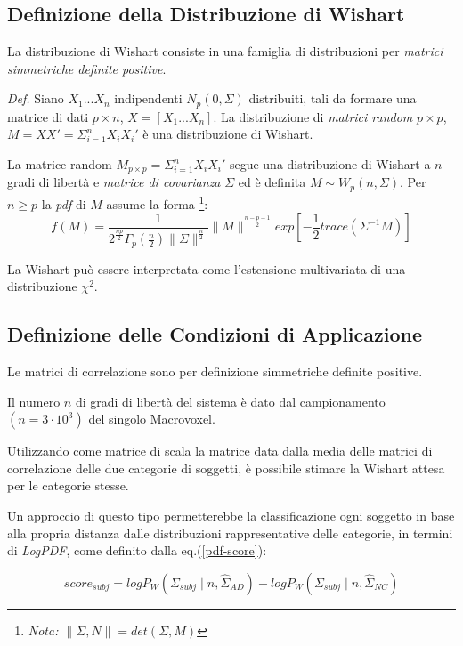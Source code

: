 \documentclass[12pt,openright,a4paper]{article}
\begin{document}
\subsection{Definizione della Distribuzione di Wishart}

La distribuzione di Wishart consiste in una famiglia di distribuzioni per \textit{matrici simmetriche definite positive}.

\textit{Def.} Siano $X_1...X_n$ indipendenti $N_p(0,\Sigma)$ distribuiti, tali da formare una matrice di dati $p\times n$, $X=[X_1...X_n]$.
La distribuzione di \textit{matrici random} $p\times p$, $M=XX'=\Sigma^n_{i=1}X_iX_i'$ è una distribuzione di Wishart. \cite{AMS}

La matrice random $M_{p\times p}=\Sigma^n_{i=1}X_iX_i'$ segue una distribuzione di Wishart a $n$ gradi di libertà e \textit{matrice di covarianza} $\Sigma$ ed è definita $M\sim W_p(n, \Sigma)$.
Per $n\geq p$ la \textit{pdf} di $M$ assume la forma   \footnote{\textit{Nota: $\|\Sigma , N \| = det (\Sigma , M)$}}:  
\begin{equation}
f(M)=\frac{1}{2^{\frac{np}{2}}\Gamma_p(\frac{n}{2})\|\Sigma\|^{\frac{n}{2}}}\|M\|^{\frac{n-p-1}{2}}exp[-\frac{1}{2}trace(\Sigma^{-1}M)]
\label{Wishat-pdf}
\end{equation}

La Wishart può essere interpretata come l'estensione multivariata di una distribuzione $\chi^2$.



\subsection{Definizione delle Condizioni di Applicazione}

Le matrici di correlazione sono per definizione simmetriche definite positive.

Il numero $n$ di gradi di libertà del sistema è dato dal campionamento $(n=3\cdot 10^3)$ del singolo Macrovoxel.

Utilizzando come matrice di scala la matrice data dalla media delle matrici di correlazione delle due categorie di soggetti, è possibile stimare la Wishart attesa per le categorie stesse.

Un approccio di questo tipo permetterebbe la classificazione ogni soggetto in base alla propria distanza dalle distribuzioni rappresentative delle categorie, in termini di \textit{LogPDF}, come definito dalla eq.(\ref{pdf-score}):

\begin{equation}
score_{subj }= logP_{W}(\Sigma_{subj}\mid n, \hat{\Sigma}_{AD})-logP_{W}(\Sigma_{subj}\mid n,\hat{\Sigma}_{NC})
\label{pdf-score}
\end{equation}
\end{document}

